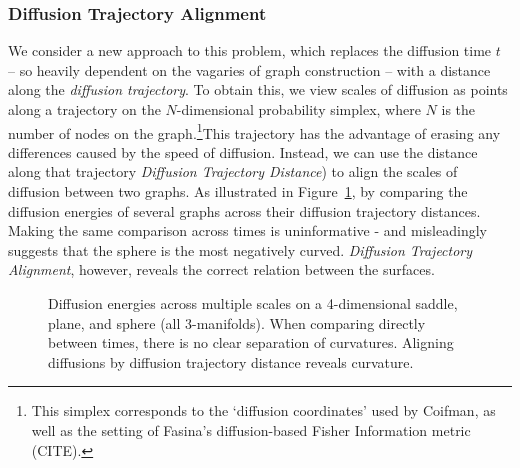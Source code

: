 \documentclass[
  letterpaper,
  DIV=11,
  numbers=noendperiod]{scrartcl}
\theoremstyle{plain}
\theoremstyle{plain}
\theoremstyle{definition}
\theoremstyle{plain}
\theoremstyle{definition}
\theoremstyle{plain}
\theoremstyle{remark}
\begin{document}
\subsubsection{Diffusion Trajectory
Alignment}\label{diffusion-trajectory-alignment}

We consider a new approach to this problem, which replaces the diffusion
time \(t\) -- so heavily dependent on the vagaries of graph construction
-- with a distance along the \emph{diffusion trajectory}. To obtain
this, we view scales of diffusion as points along a trajectory on the
\(N\)-dimensional probability simplex, where \(N\) is the number of
nodes on the graph.\footnote{This simplex corresponds to the `diffusion
  coordinates' used by Coifman, as well as the setting of Fasina's
  diffusion-based Fisher Information metric (CITE).}This trajectory has
the advantage of erasing any differences caused by the speed of
diffusion. Instead, we can use the distance along that trajectory
\emph{Diffusion Trajectory Distance}) to align the scales of diffusion
between two graphs. As illustrated in Figure~\ref{fig-curvature-curves},
by comparing the diffusion energies of several graphs across their
diffusion trajectory distances. Making the same comparison across times
is uninformative - and misleadingly suggests that the sphere is the most
negatively curved. \emph{Diffusion Trajectory Alignment}, however,
reveals the correct relation between the surfaces.

\begin{figure}[H]


\caption{\label{fig-curvature-curves}Diffusion energies across multiple
scales on a 4-dimensional saddle, plane, and sphere (all 3-manifolds).
When comparing directly between times, there is no clear separation of
curvatures. Aligning diffusions by diffusion trajectory distance reveals
curvature.}

\end{figure}%
\end{document}
